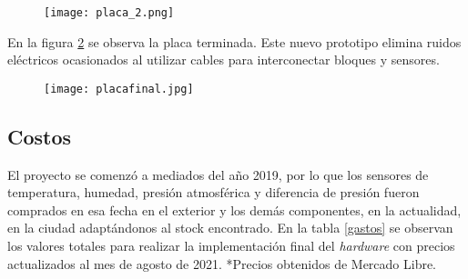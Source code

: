 \begin{figure}[H]
	\centering
	\texttt{[image: placa\_2.png]}
	\label{fig:hardBloq}
\end{figure}

En la figura \ref{fig:placafinal} se observa la placa terminada. Este nuevo prototipo elimina ruidos eléctricos ocasionados al utilizar cables para interconectar bloques y sensores.

\begin{figure}[H]
	\centering
	\texttt{[image: placafinal.jpg]}
	\label{fig:placafinal}
\end{figure}





\subsection{Costos}
El proyecto se comenzó a mediados del año 2019, por lo que los sensores de temperatura, humedad, 
presión atmosférica y diferencia de presión fueron comprados en esa fecha en el exterior y los demás componentes, en la actualidad, en la ciudad adaptándonos al stock encontrado. En la tabla \ref{gastos} se observan los valores totales para realizar la implementación final del \textit{hardware} con precios actualizados al mes de agosto de 2021. *Precios obtenidos de Mercado Libre.


